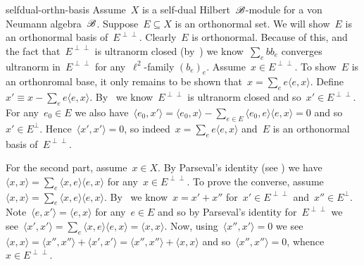 \begin{solution}{selfdual-orthn-basis}%
    Assume~$X$ is a self-dual Hilbert~$\mathscr{B}$-module for a von Neumann
    algebra~$\mathscr{B}$. Suppose~$E \subseteq X$ is an orthonormal set.
We will show~$E$ is an orthonormal basis of~$E^{\perp\perp}$.
Clearly~$E$ is orthonormal.
    Because of this, and the fact that~$E^{\perp\perp}$ is ultranorm
        closed (by~) 
        we know~$\sum_e b b_e$ converges ultranorm in~$E^{\perp\perp}$
        for any~$\ell^2$-family $(b_e)_e$.
Assume~$x \in E^{\perp\perp}$.
To show~$E$ is an orthonromal base,
    it only remains to be shown that~$x = \sum_e e \langle e, x\rangle$.
Define~$x' \equiv x - \sum_e e \langle e, x\rangle$.
By~ we know~$E^{\perp\perp}$ is ultranorm closed
    and so~$x' \in E^{\perp\perp}$.
For any~$e_0\in E$
    we also have~$\langle e_0, x'\rangle = \langle e_0,x \rangle
            - \sum_{e \in E} \langle e_0, e\rangle\langle e, x\rangle
            = 0 $ and so~$x' \in E^{\perp}$.
    Hence~$\langle x',x'\rangle = 0$, so indeed~$x = \sum_e e\langle e, x\rangle$
        and~$E$ is an orthonormal basis of~$E^{\perp\perp}$.

For the second part, assume~$x \in X$.
    By Parseval's identity (see )
        we have~$\langle x, x\rangle = \sum_e \langle x,e \rangle\langle e,x\rangle$
        for any~$x \in E^{\perp\perp}$.
To prove the converse,
    assume~$\langle x, x\rangle = \sum_e \langle x,e \rangle\langle e,x\rangle$.
By~ we know~$x = x' + x''$
    for~$x' \in E^{\perp\perp}$  and~$x'' \in E^\perp$.
Note~$\langle e, x' \rangle = \langle e, x\rangle$ for any~$e \in E$
    and so by Parseval's identity for~$E^{\perp\perp}$
    we see~$\langle x',x'\rangle = \sum_e \langle x, e\rangle\langle e, x\rangle
        = \langle x, x\rangle$.
Now, using~$\langle x'',x'\rangle = 0$
    we see~$\langle x,x\rangle = \langle x'', x''\rangle + \langle x', x'\rangle
        = \langle x'', x''\rangle + \langle x, x\rangle$
        and so~$\langle x'', x''\rangle=0$, whence~$x \in E^{\perp\perp}$.
\end{solution}
